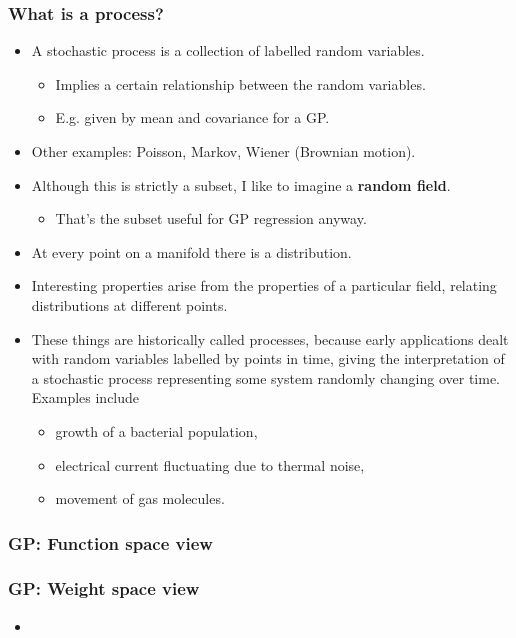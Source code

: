 \begin{frame} \frametitle{What is a process?}
\begin{itemize}
  \item A stochastic process is a collection of labelled random variables.
  \begin{itemize}
    \item Implies a certain relationship between the random variables.
    \item E.g. given by mean and covariance for a GP.
  \end{itemize}
  \item Other examples: Poisson, Markov, Wiener (Brownian motion).
  \vspace{4mm}
  \item Although this is strictly a subset,
    I like to imagine a \textbf{random field}.
  \begin{itemize}
    \item That's the subset useful for GP regression anyway.
  \end{itemize}
  \item At every point on a manifold there is a distribution.
  \item Interesting properties arise from the properties of a particular field,
    relating distributions at different points.
  \vspace{4mm}
  \item These things are historically called processes, because early
    applications dealt with random variables labelled by points in time,
    giving the interpretation of a stochastic process representing
    some system randomly changing over time. Examples include
  \begin{itemize}
    \item growth of a bacterial population,
    \item electrical current fluctuating due to thermal noise,
    \item movement of gas molecules.
  \end{itemize}
\end{itemize}
\end{frame}

\begin{frame} \frametitle{GP: Function space view}
\end{frame}

\begin{frame} \frametitle{GP: Weight space view}
\begin{itemize}
  \item {}
\end{itemize}
\end{frame}


